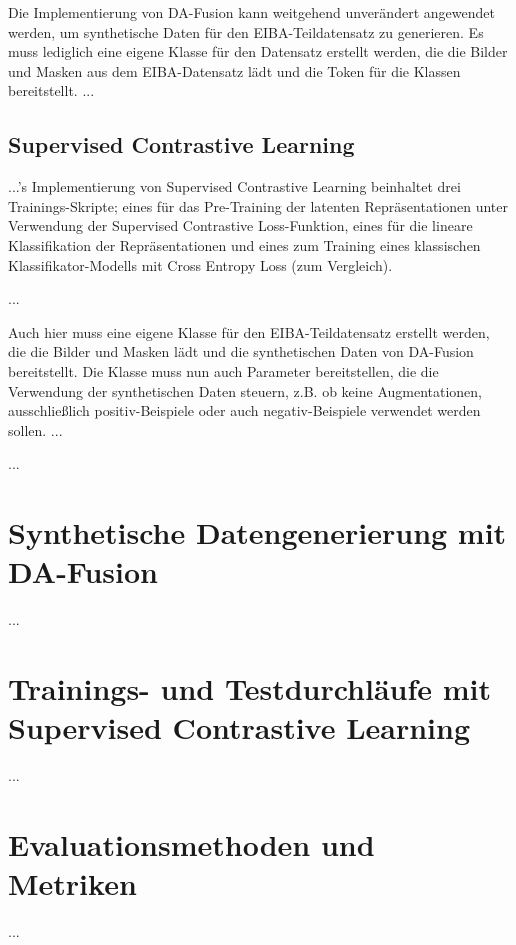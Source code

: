 Die Implementierung von DA-Fusion kann weitgehend unverändert angewendet werden, um synthetische Daten für den EIBA-Teildatensatz zu generieren. Es muss lediglich eine eigene Klasse für den Datensatz erstellt werden, die die Bilder und Masken aus dem EIBA-Datensatz lädt und die Token für die Klassen bereitstellt. ...

\subsection{Supervised Contrastive Learning}


...'s Implementierung von Supervised Contrastive Learning beinhaltet drei Trainings-Skripte; eines für das Pre-Training der latenten Repräsentationen unter Verwendung der Supervised Contrastive Loss-Funktion, eines für die lineare Klassifikation der Repräsentationen und eines zum Training eines klassischen Klassifikator-Modells mit Cross Entropy Loss (zum Vergleich).

...

Auch hier muss eine eigene Klasse für den EIBA-Teildatensatz erstellt werden, die die Bilder und Masken lädt und die synthetischen Daten von DA-Fusion bereitstellt. Die Klasse muss nun auch Parameter bereitstellen, die die Verwendung der synthetischen Daten steuern, z.B. ob keine Augmentationen, ausschließlich positiv-Beispiele oder auch negativ-Beispiele verwendet werden sollen. ...

...

\section{Synthetische Datengenerierung mit DA-Fusion}

...

\section{Trainings- und Testdurchläufe mit Supervised Contrastive Learning}

...

\section{Evaluationsmethoden und Metriken}

...